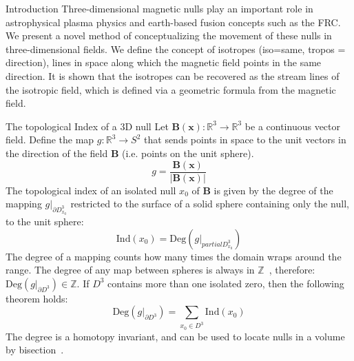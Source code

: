 \documentclass[final]{beamer}
\newlength{\onecolwid}
\newlength{\twocolwid}
\begin{document}
\begin{frame}[t]
\begin{columns}[t]
\begin{column}{\twocolwid}
\begin{columns}[t,totalwidth=\twocolwid]
\begin{column}{\onecolwid}\vspace{-.6in} %

\begin{block}{Introduction}
	Three-dimensional magnetic nulls play an important role in astrophysical
	plasma physics and earth-based fusion concepts such as the FRC. 
	We present a novel method of conceptualizing the movement of these nulls in
	three-dimensional fields. 
	We define the concept of isotropes (iso=same, tropos = direction), lines in space
	along which the magnetic field points in the same direction. 
	It is shown that the isotropes can be recovered as the stream lines of
	the isotropic field, which is defined via a geometric formula from the
	magnetic field.
	
\end{block}


\begin{block}{The topological Index of a 3D null}
    Let $\mathbf{B}(\mathbf{x}): \mathbb{R}^3\rightarrow \mathbb{R}^3$ be a continuous
    vector field.
    Define the map $g:\mathbb{R}^3\rightarrow S^2$ that sends points in
    space to the unit vectors in the direction of the field $\mathbf{B}$
    (i.e. points on the unit sphere).
    \begin{equation}\label{eq:director}
        g = \frac{\mathbf{B}(\mathbf{x})}{|\mathbf{B}(\mathbf{x})|}
    \end{equation}
    The topological index of an isolated null $x_0$ of $\mathbf{B}$ is given by
    the degree of the mapping $g|_{\partial D^3_{x_0}}$ restricted to the surface of
    a solid sphere containing only the null, to the unit sphere:
    \begin{equation}\label{eq:index1}
        \mathrm{Ind}(x_0)=\mathrm{Deg}(g|_{partial D^3_{x_0}})
    \end{equation}
    The degree of a mapping counts how many times the domain wraps around the range.
    The degree of any map between spheres is always in
    $\mathbb{Z}$~\cite{brouwer1911abbildung}, therefore:
    $\mathrm{Deg}(g|_{\partial D^3})\in\mathbb{Z}$.
    If $D^3$ contains more than one isolated zero, then the following theorem holds:
    \begin{equation}\label{eq:indextheorem}
        \mathrm{Deg}(g|_{\partial D^3})= \sum_{x_0\in D^3} \mathrm{Ind}(x_0)
    \end{equation}
    The degree is a homotopy invariant, and can be used to locate nulls in a volume by
    bisection~\cite{greene1992locating}.


\end{block}
\end{column}
\end{columns}
\end{column}
\end{columns}
\end{frame}
\end{document}
